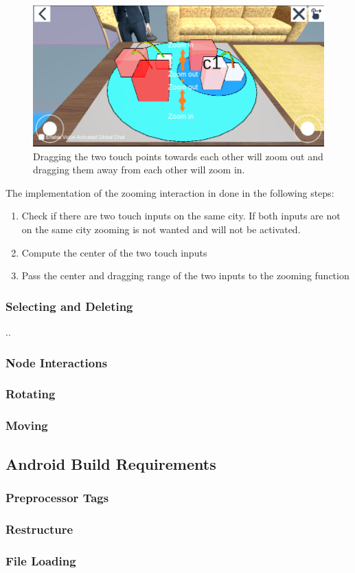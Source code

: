 \begin{figure}[htb]
    \centering
    \includegraphics[width=1\textwidth]{Implementation/img/zoom.png}
    \caption{Dragging the two touch points towards each other will zoom out and dragging them away from each other will zoom in.}\label{fig:zooming}
\end{figure}

The implementation of the zooming interaction in done in the following steps: 
\begin{enumerate}
    \item Check if there are two touch inputs on the same \gls{city}. If both inputs are not on the same city zooming is not wanted and will not be activated.
    \item Compute the center of the two touch inputs
    \item Pass the center and dragging range of the two inputs to the zooming function
\end{enumerate}

\subsubsection{Selecting and Deleting}
..
\subsubsection{Node Interactions}
\subsubsection{Rotating}
\subsubsection{Moving}

\subsection{Android Build Requirements}
\subsubsection{Preprocessor Tags}
\subsubsection{Restructure}
\subsubsection{File Loading}